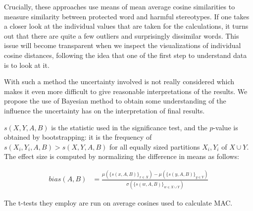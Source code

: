 \documentclass[
  10pt,
  dvipsnames,enabledeprecatedfontcommands, twocolumn]{scrartcl}
\begin{document}
Crucially, these approaches use means of mean average cosine
similarities to measure similarity between protected word and harmful
stereotypes. If one takes a closer look at the individual values that
are taken for the calculations, it turns out that there are quite a few
outliers and surprisingly dissimilar words. This issue will become
transparent when we inspect the visualizations of individual cosine
distances, following the idea that one of the first step to understand
data is to look at it.

With such a method the uncertainty involved is not really considered
which makes it even more difficult to give reasonable interpretations of
the results. We propose the use of Bayesian method to obtain some
understanding of the influence the uncertainty has on the interpretation
of final results.



\noindent \(s(X,Y,A,B)\) is the statistic used in the significance test,
and the \(p\)-value is obtained by bootstrapping: it is the frequency of
\(s(X_i,Y_i,A,B)>s(X,Y,A,B)\) for all equally sized partitions
\(X_i, Y_i\) of \(X\cup Y\). The effect size is computed by normalizing
the difference in means as follows:

\vspace{-2mm}

\footnotesize

\begin{align}
bias(A,B) & = \frac{
\mu(\{s(x,A,B)\}_{x\in X}) -\mu(\{s(y,A,B)\}_{y\in Y}) 
}{
\sigma(\{s(w,A,B)\}_{w\in X\cup Y})
}
\end{align}

\normalsize

The t-tests they employ are run on average cosines used to calculate
MAC.
\end{document}
